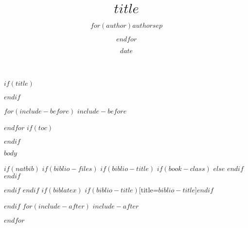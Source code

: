 \documentclass[fontsize=12pt,$if(fontsize)$$fontsize$,$endif$$if(lang)$$lang$,$endif$]{scrreprt}
\title{$title$}
\author{$for(author)$$author$$sep$ \and $endfor$}
\date{$date$}
\begin{document}
$if(title)$
\maketitle
$endif$

$for(include-before)$
$include-before$

$endfor$
$if(toc)$
{
\hypersetup{linkcolor=black}
\tableofcontents
\listoffigures 
\listoftables 
}
$endif$

\nocite{Barrie2007}


$body$

$if(natbib)$
$if(biblio-files)$
$if(biblio-title)$
$if(book-class)$
\renewcommand\bibname{$biblio-title$}
$else$
\renewcommand\refname{$biblio-title$}
$endif$
$endif$


$endif$
$endif$
$if(biblatex)$
\printbibliography$if(biblio-title)$[title=$biblio-title$]$endif$

$endif$
$for(include-after)$
$include-after$

$endfor$
\end{document}
